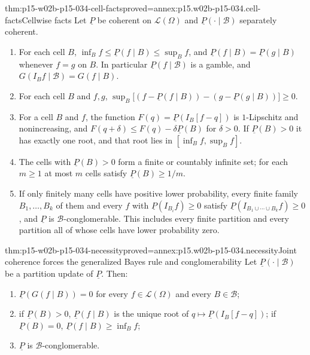 \begin{hblemma}{thm:p15-w02b-p15-034-cell-facts}{proved=annex:p15.w02b-p15-034.cell-facts}{Cellwise facts}
Let \(\underline P\) be coherent on \(\mathcal L(\Omega)\) and
\(\underline P(\cdot\mid\mathcal B)\) separately coherent.
\begin{enumerate}
\item For each cell \(B\),
\(\inf_Bf\leq\underline P(f\mid B)\leq\sup_Bf\), and
\(\underline P(f\mid B)=\underline P(g\mid B)\) whenever \(f=g\) on
\(B\). In particular \(\underline P(f\mid\mathcal B)\) is a gamble, and
\(G(I_Bf\mid\mathcal B)=G(f\mid B)\).
\item For each cell \(B\) and \(f,g\), \(\sup_B\bigl[(f-\underline P(f\mid B))-(g-\underline P(g\mid B))\bigr]\geq0\).
\item For a cell \(B\) and \(f\), the function
\(F(q)=\underline P(I_B[f-q])\) is \(1\)-Lipschitz and nonincreasing, and
\(F(q+\delta)\leq F(q)-\delta\underline P(B)\) for \(\delta>0\).
If \(\underline P(B)>0\) it has exactly one root, and that root lies in
\([\inf_Bf,\sup_Bf]\).
\item The cells with \(\underline P(B)>0\) form a finite or countably
infinite set; for each \(m\geq1\) at most \(m\) cells satisfy
\(\underline P(B)\geq1/m\).
\item If only finitely many cells have positive lower probability, every
finite family \(B_1,\ldots,B_k\) of them and every \(f\) with
\(\underline P(I_{B_i}f)\geq0\) satisfy
\(\underline P(I_{B_1\cup\cdots\cup B_k}f)\geq0\), and \(\underline P\)
is \(\mathcal B\)-conglomerable. This includes every finite partition and
every partition all of whose cells have lower probability zero.
\end{enumerate}
\end{hblemma}

\begin{hbtheorem}{thm:p15-w02b-p15-034-necessity}{proved=annex:p15.w02b-p15-034.necessity}{Joint coherence forces the generalized Bayes rule and conglomerability}
Let \(\underline P(\cdot\mid\mathcal B)\) be a partition update of
\(\underline P\). Then:
\begin{enumerate}
\item \(\underline P(G(f\mid B))=0\) for every \(f\in\mathcal L(\Omega)\)
and every \(B\in\mathcal B\);
\item if \(\underline P(B)>0\), \(\underline P(f\mid B)\) is the unique
root of \(q\mapsto\underline P(I_B[f-q])\); if \(\underline P(B)=0\),
\(\underline P(f\mid B)\geq\inf_Bf\);
\item \(\underline P\) is \(\mathcal B\)-conglomerable.
\end{enumerate}
\end{hbtheorem}

